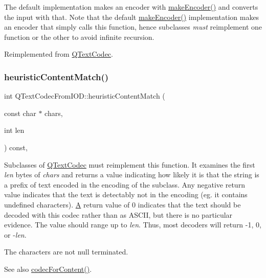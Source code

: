 The default implementation makes an encoder with \mbox{\hyperlink{class_q_text_codec_aa7dccd7fc1b578de0b7599b040d98e11}{make\+Encoder()}} and converts the input with that. Note that the default \mbox{\hyperlink{class_q_text_codec_aa7dccd7fc1b578de0b7599b040d98e11}{make\+Encoder()}} implementation makes an encoder that simply calls this function, hence subclasses {\itshape must} reimplement one function or the other to avoid infinite recursion. 

Reimplemented from \mbox{\hyperlink{class_q_text_codec_a564dc8bf15241a165a38287c1d26e48c}{Q\+Text\+Codec}}.

\mbox{\label{class_q_text_codec_from_i_o_d_a5a3016db9b6c0f2ad76bbf74ce60a053}} 
\subsubsection{\texorpdfstring{heuristicContentMatch()}{heuristicContentMatch()}}
{\footnotesize\ttfamily int Q\+Text\+Codec\+From\+I\+O\+D\+::heuristic\+Content\+Match (\begin{DoxyParamCaption}\item[{const char $\ast$}]{chars,  }\item[{int}]{len }\end{DoxyParamCaption}) const\hspace{0.3cm}{\ttfamily [inline]}, {\ttfamily [virtual]}}

Subclasses of \mbox{\hyperlink{class_q_text_codec}{Q\+Text\+Codec}} must reimplement this function. It examines the first {\itshape len} bytes of {\itshape chars} and returns a value indicating how likely it is that the string is a prefix of text encoded in the encoding of the subclass. Any negative return value indicates that the text is detectably not in the encoding (eg. it contains undefined characters). \mbox{\hyperlink{class_a}{A}} return value of 0 indicates that the text should be decoded with this codec rather than as A\+S\+C\+II, but there is no particular evidence. The value should range up to {\itshape len}. Thus, most decoders will return -\/1, 0, or -\/{\itshape len}.

The characters are not null terminated.

\begin{DoxySeeAlso}{See also}
\mbox{\hyperlink{class_q_text_codec_aeb3ec365c6c4f1812689a2b66ed09e27}{codec\+For\+Content()}}. 
\end{DoxySeeAlso}


